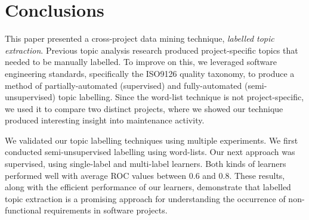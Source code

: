 \documentclass[smallextended]{svjour3}       %
\begin{document}
\section{Conclusions}
This paper presented a cross-project data mining technique,
\emph{labelled topic extraction}. %
Previous topic analysis research produced project-specific
topics that needed to be manually labelled.
To improve on this, we leveraged software engineering standards,
specifically the ISO9126 quality taxonomy, to produce a method of partially-automated (supervised) and fully-automated (semi-unsupervised) topic labelling.
Since the word-list technique is not project-specific, we used it to compare two distinct projects, where we showed our technique produced interesting insight into maintenance activity. %


We validated our topic labelling techniques using multiple experiments. %
We first conducted semi-unsupervised labelling using word-lists. 
Our next approach was supervised, using single-label and multi-label learners. 
Both kinds of learners performed well with average
ROC values between $0.6$ and $0.8$. These results, along with the efficient performance of our learners, demonstrate that labelled topic extraction is a promising approach for understanding the occurrence of non-functional requirements in software projects. 
\end{document}
